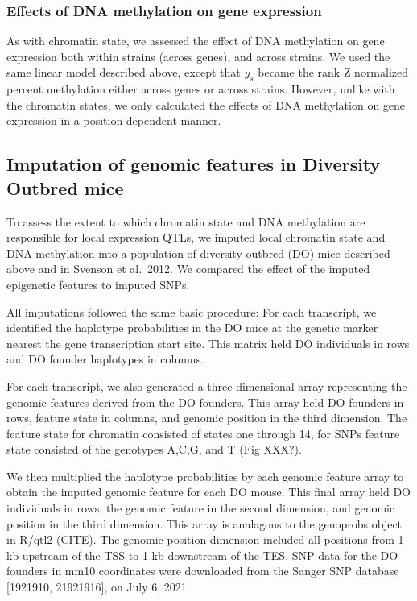 \documentclass[10pt,letterpaper]{article}
\begin{document}
\hypertarget{effects-of-dna-methylation-on-gene-expression}{%
\subsubsection{Effects of DNA methylation on gene
expression}\label{effects-of-dna-methylation-on-gene-expression}}

As with chromatin state, we assessed the effect of DNA methylation on
gene expression both within strains (across genes), and across strains.
We used the same linear model described above, except that \(y_{s}\)
became the rank Z normalized percent methylation either across genes or
across strains. However, unlike with the chromatin states, we only
calculated the effects of DNA methylation on gene expression in a
position-dependent manner.

\hypertarget{imputation-of-genomic-features-in-diversity-outbred-mice}{%
\subsection{Imputation of genomic features in Diversity Outbred
mice}\label{imputation-of-genomic-features-in-diversity-outbred-mice}}

To assess the extent to which chromatin state and DNA methylation are
responsible for local expression QTLs, we imputed local chromatin state
and DNA methylation into a population of diversity outbred (DO) mice
described above and in Svenson et al.~2012. We compared the effect of
the imputed epigenetic features to imputed SNPs.

All imputations followed the same basic procedure: For each transcript,
we identified the haplotype probabilities in the DO mice at the genetic
marker nearest the gene transcription start site. This matrix held DO
individuals in rows and DO founder haplotypes in columns.

For each transcript, we also generated a three-dimensional array
representing the genomic features derived from the DO founders. This
array held DO founders in rows, feature state in columns, and genomic
position in the third dimension. The feature state for chromatin
consisted of states one through 14, for SNPs feature state consisted of
the genotypes A,C,G, and T (Fig XXX?).

We then multiplied the haplotype probabilities by each genomic feature
array to obtain the imputed genomic feature for each DO mouse. This
final array held DO individuals in rows, the genomic feature in the
second dimension, and genomic position in the third dimension. This
array is analagous to the genoprobs object in R/qtl2 (CITE). The genomic
position dimension included all positions from 1 kb upstream of the TSS
to 1 kb downstream of the TES. SNP data for the DO founders in mm10
coordinates were downloaded from the Sanger SNP database {[}1921910,
21921916{]}, on July 6, 2021.
\end{document}
